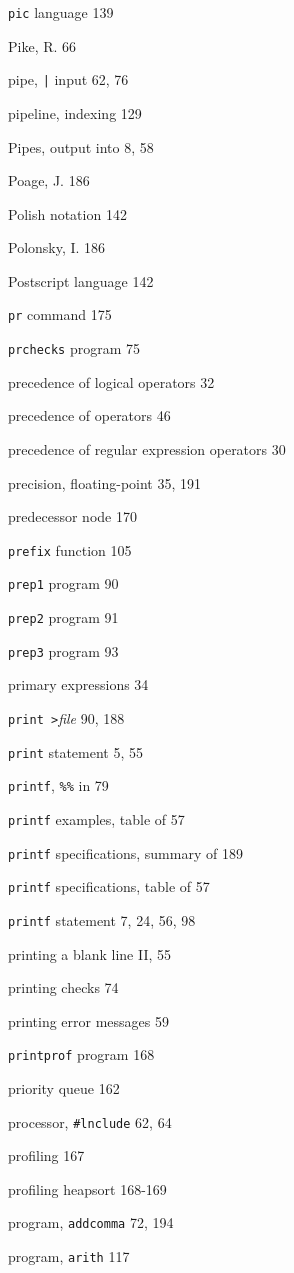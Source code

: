 \begin{multicols}{2}
\verb'pic' language 139

Pike, R. 66

pipe, \verb'|' input 62, 76

pipeline, indexing 129

Pipes, output into 8, 58

Poage, J. 186

Polish notation 142

Polonsky, I. 186

Postscript language 142

\verb'pr' command 175

\verb'prchecks' program 75

precedence of logical operators 32

precedence of operators 46

precedence of regular expression operators 30

precision, floating-point 35, 191

predecessor node 170

\verb'prefix' function 105

\verb'prep1' program 90

\verb'prep2' program 91

\verb'prep3' program 93

primary expressions 34

\verb'print >'\textit{file} 90, 188

\verb'print' statement 5, 55

\verb'printf', \verb'%%' in 79

\verb'printf' examples, table of 57

\verb'printf' specifications, summary of 189


\verb'printf' specifications, table of 57


\verb'printf' statement 7, 24, 56, 98

printing a blank line II, 55

printing checks 74

printing error messages 59

\verb'printprof' program 168

priority queue 162

processor, \verb'#lnclude' 62, 64

profiling 167

profiling heapsort 168-169

program, \verb'addcomma' 72, 194

program, \verb'arith' 117


\end{multicols}
